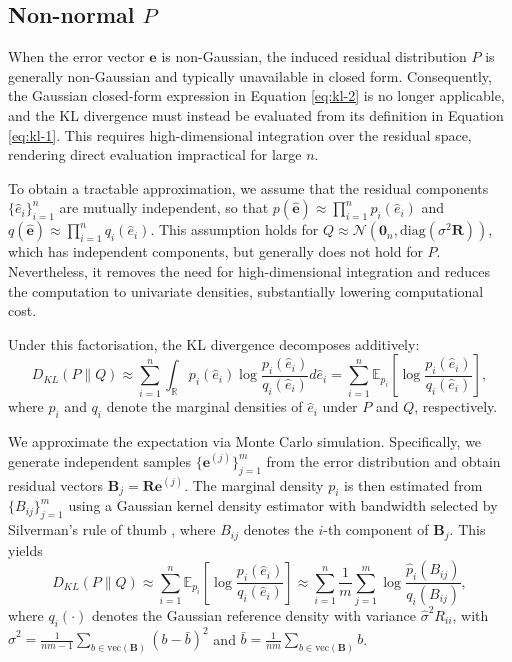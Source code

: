 \documentclass[]{interact}
\theoremstyle{plain}%
\theoremstyle{definition}
\theoremstyle{remark}
\begin{document}
\subsection{\texorpdfstring{Non-normal
\(P\)}{Non-normal P}}\label{non-normal-p}

When the error vector \(\boldsymbol{e}\) is non-Gaussian, the induced
residual distribution \(P\) is generally non-Gaussian and typically
unavailable in closed form. Consequently, the Gaussian closed-form
expression in Equation \ref{eq:kl-2} is no longer applicable, and the KL
divergence must instead be evaluated from its definition in Equation
\ref{eq:kl-1}. This requires high-dimensional integration over the
residual space, rendering direct evaluation impractical for large \(n\).

To obtain a tractable approximation, we assume that the residual
components \(\{\hat{e}_i\}_{i=1}^n\) are mutually independent, so that
\(p(\hat{\boldsymbol{e}}) \approx \prod_{i=1}^n p_i(\hat{e}_i)\) and
\(q(\hat{\boldsymbol{e}}) \approx \prod_{i=1}^n q_i(\hat{e}_i)\). This
assumption holds for
\(Q \approx \mathcal{N}\left(\boldsymbol{0}_n,\mathrm{diag}(\sigma^2\boldsymbol{R})\right)\),
which has independent components, but generally does not hold for \(P\).
Nevertheless, it removes the need for high-dimensional integration and
reduces the computation to univariate densities, substantially lowering
computational cost.

Under this factorisation, the KL divergence decomposes additively:
\[D_{KL}(P \| Q) \approx \sum_{i=1}^n \int_{\mathbb{R}} p_i(\hat{e}_i)\log\frac{p_i(\hat{e}_i)}{q_i(\hat{e}_i)} d\hat{e}_i = \sum_{i=1}^n \mathbb{E}_{p_i}\left[\log\frac{p_i(\hat{e}_i)}{q_i(\hat{e}_i)}\right],\]
\noindent where \(p_i\) and \(q_i\) denote the marginal densities of
\(\hat{e}_i\) under \(P\) and \(Q\), respectively.

We approximate the expectation via Monte Carlo simulation. Specifically,
we generate independent samples \(\{\boldsymbol{e}^{(j)}\}_{j=1}^m\)
from the error distribution and obtain residual vectors
\(\boldsymbol{B}_j = \boldsymbol{R}\boldsymbol{e}^{(j)}\). The marginal
density \(p_i\) is then estimated from \(\{B_{ij}\}_{j=1}^m\) using a
Gaussian kernel density estimator with bandwidth selected by Silverman's
rule of thumb \citep{silverman2018density}, where \(B_{ij}\) denotes the
\(i\)-th component of \(\boldsymbol{B}_j\). This yields
\[D_{KL}(P \| Q) \approx \sum_{i=1}^n \mathbb{E}_{p_i}\left[\log\frac{p_i(\hat{e}_i)}{q_i(\hat{e}_i)}\right] \approx \sum_{i=1}^n\frac{1}{m}\sum_{j=1}^m \log\frac{\hat{p}_i(B_{ij})}{q_i(B_{ij})},\]
\noindent where \(q_i(\cdot)\) denotes the Gaussian reference density
with variance \(\hat{\sigma}^2R_{ii}\), with
\(\hat{\sigma}^2 = \frac{1}{nm - 1}\sum_{b \in \mathrm{vec}(\boldsymbol{B})} \left(b - \bar{b}\right)^2\)
and
\(\bar{b} = \frac{1}{nm}\sum_{b \in \mathrm{vec}(\boldsymbol{B})} b\).
\end{document}
